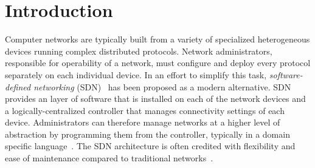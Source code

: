 

\newcommand{\souffle}{Souffl\'{e}\xspace}
\newcommand{\vampire}{Vampire\xspace}
\newcommand{\eprover}{E\xspace}
\newcommand{\spass}{Spass\xspace}


\newcommand{\Datalog}{Datalog\xspace}

\newcommand*{\rl}{\mathrel{\leftarrow}}
\newcommand*{\comma}{\mathrel{\wedge}}

\renewcommand*{\phi}{\varphi}

\newcommand{\typedRel}[1]{\mathit{#1}}
\newcommand{\typed}[2]{\typedRel{#1}({#2})}

\newcommand{\pred}[1]{\mathit{#1}} %
\newcommand{\const}[1]{\mathrm{#1}} %
\newcommand{\type}[1]{\mathrm{#1}} %

\newcommand{\sem}[1]{(#1)} %

\section{Introduction}
\label{sect:aws/introduction}
Computer networks are typically built from a variety of specialized heterogeneous devices running complex distributed protocols. Network administrators, responsible for operability of a network, must configure and deploy every protocol separately on each individual device. In an effort to simplify this task, \emph{software-defined networking} (SDN)~\cite{SDN} has been proposed as a modern alternative. SDN provides an layer of software that is installed on each of the network devices and a logically-centralized controller that manages connectivity settings of each device. Administrators can therefore manage networks at a higher level of abstraction by programming them from the controller, typically in a domain specific language~\cite{DBLP:journals/cm/FosterGRSFKMRRSWH13}. The SDN architecture is often credited with flexibility and ease of maintenance compared to traditional networks~\cite{benzekki2016software}.

